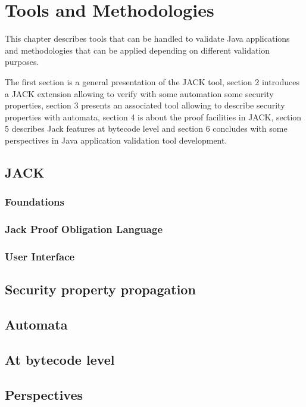 \chapter{Tools and Methodologies}
This chapter describes tools that can be handled to validate Java applications and methodologies that can be applied depending on different validation purposes.

The first section is a general presentation of the JACK tool, section 2 introduces a JACK extension allowing to verify with some automation some security properties, section 3 presents an associated tool allowing to describe security properties with automata, section 4 is about the proof facilities in JACK, section 5 describes Jack features at bytecode level and section 6 concludes with some perspectives in Java application validation tool development.
\section{JACK}

\subsection{Foundations}

\subsection{Jack Proof Obligation Language}

\subsection{User Interface}

%
%

\section{Security property propagation}




%
%

\section{Automata}


\section{At bytecode level}






%

\section{Perspectives}


